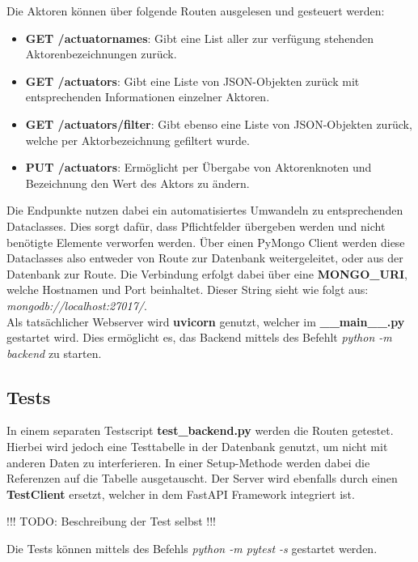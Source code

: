 Die Aktoren können über folgende Routen ausgelesen und gesteuert werden:
\begin{itemize}
\item \textbf{GET /actuatornames}: Gibt eine List aller zur verfügung stehenden Aktorenbezeichnungen zurück.
\item \textbf{GET /actuators}: Gibt eine Liste von JSON-Objekten zurück mit entsprechenden Informationen einzelner Aktoren.
\item \textbf{GET /actuators/filter}: Gibt ebenso eine Liste von JSON-Objekten zurück, welche per Aktorbezeichnung gefiltert wurde.
\item \textbf{PUT /actuators}: Ermöglicht per Übergabe von Aktorenknoten und Bezeichnung den Wert des Aktors zu ändern.
\end{itemize}

Die Endpunkte nutzen dabei ein automatisiertes Umwandeln zu entsprechenden Dataclasses.
Dies sorgt dafür, dass Pflichtfelder übergeben werden und nicht benötigte Elemente verworfen werden.
Über einen PyMongo Client werden diese Dataclasses also entweder von Route zur Datenbank weitergeleitet, oder aus der Datenbank zur Route.
Die Verbindung erfolgt dabei über eine \textbf{MONGO\_URI}, welche Hostnamen und Port beinhaltet. Dieser String sieht wie folgt aus: \textit{mongodb://localhost:27017/}. \\
Als tatsächlicher Webserver wird \textbf{uvicorn} genutzt, welcher im \textbf{\_\_main\_\_.py} gestartet wird. Dies ermöglicht es, das Backend mittels des Befehlt \textit{python -m backend} zu starten.

\subsection{Tests}
In einem separaten Testscript \textbf{test\_backend.py} werden die Routen getestet. 
Hierbei wird jedoch eine Testtabelle in der Datenbank genutzt, um nicht mit anderen Daten zu interferieren. 
In einer Setup-Methode werden dabei die Referenzen auf die Tabelle ausgetauscht. 
Der Server wird ebenfalls durch einen \textbf{TestClient} ersetzt, welcher in dem FastAPI Framework integriert ist.

!!! TODO: Beschreibung der Test selbst !!!

Die Tests können mittels des Befehls \textit{python -m pytest -s} gestartet werden.
